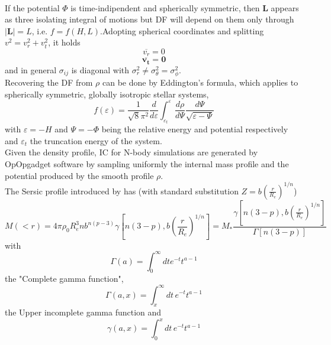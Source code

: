 \documentclass[12pt,twoside,openany]{book}
\begin{document}
\\If the potential $\Phi$ is time-indipendent and spherically symmetric, then $\mathbf{L}$ 
appears as three isolating integral of motions but DF will depend on them only through 
$|\mathbf{L}|=L$, i.e. $f=f(H,L)$.Adopting spherical coordinates and splitting 
$v^2=v_r^2+v_t^2$, it holds 
\begin{equation}
    \overline{v_r}=0
\end{equation}
\begin{equation}
    \overline{\mathbf{v_t}}=\mathbf{0}
\end{equation}
and in general $\sigma_{ij}$ is diagonal with $\sigma^2_r\ne \sigma^2_\theta=\sigma^2_\phi$.\\Recovering
the DF from $\rho$ can be done by Eddington's formula, which applies to spherically symmetric,
globally isotropic stellar systems,
\begin{equation}\label{Eddington's formula}
f(\varepsilon)=\frac{1}{\sqrt{8}\pi^2}\frac{d}{d\varepsilon}
\int_{\varepsilon_t}^{\varepsilon}
\frac{d\rho}{d\Psi}\frac{d\Psi}{\sqrt{\varepsilon-\Psi}}
\end{equation}
with $\varepsilon=-H$ and $\Psi=-\Phi$ being the relative energy and potential respectively
and $\varepsilon_t$ the truncation energy of the system.\\Given the density profile, IC for N-body
simulations are generated by OpOpgadget software by sampling uniformly the internal mass profile
and the potential produced by the smooth profile $\rho$.\\The Sersic profile introduced by 
\textcite{Prugniel} has (with standard substitution $Z=b\left(\frac{r}{R_e}\right)^{1/n}$)
\begin{equation}\label{Sersic mass profile}
    M(<r)=4\pi \rho_0 R_e^3 n b^{n(p-3)}\gamma\left[n(3-p),b\left(\frac{r}{R_e}\right)^
    {1/n}\right]=M_*\frac{\gamma\left[n(3-p),b\left(\frac{r}{R_e}\right)^
    {1/n}\right]}{\Gamma[n(3-p)]}
\end{equation}
with 
\begin{equation}\label{complete gamma fun}
    \Gamma(a)=\int_{0}^{\infty}dt e^{-t}t^{a-1}
\end{equation}
the "Complete gamma function", 
\begin{equation}\label{upper incomplete gamma fun}
    \Gamma(a,x)=\int_{x}^{\infty}dt\,e^{-t}t^{a-1}
\end{equation}
the Upper incomplete gamma function and
\begin{equation}\label{lower incomplete gamma fun}
    \gamma(a,x)=\int_{0}^{x}dt\,e^{-t}t^{a-1}
\end{equation}
\end{document}
